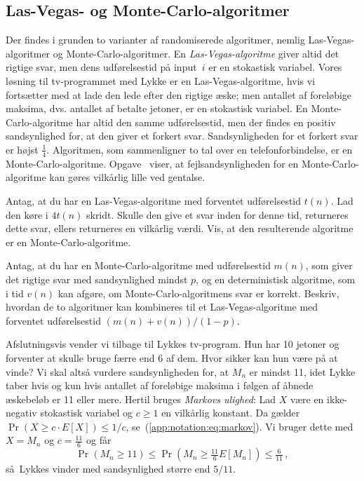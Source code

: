 \subsection{Las-Vegas- og Monte-Carlo-algoritmer}

Der findes i grunden to varianter af randomiserede algoritmer, 
nemlig Las-Vegas-algoritmer%
og Monte-Carlo-algoritmer.
En \emph{Las-Vegas-algoritme} giver altid det rigtige svar, men dens udførelsestid på input~$i$ er en stokastisk variabel. 
Vores løsning til tv-programmet med Lykke er en Las-Vegas-algoritme, hvis vi fortsætter med at lade den lede efter den rigtige æske;
men antallet af foreløbige maksima, dvs. antallet af betalte jetoner, er en stokastisk variabel.
En Monte-Carlo-algoritme har altid den samme udførelsestid, men der findes en positiv sandsynlighed for, at den giver et forkert svar.
Sandsynligheden for et forkert svar er højst $\frac14$.
Algoritmen, som sammenligner to tal over en telefonforbindelse, er en Monte-Carlo-algoritme. 
Opgave~ viser, at fejlsandsynligheden for en Monte-Carlo-algoritme kan gøres vilkårlig lille ved gentalse.  

\begin{exerc}
  Antag, at du har en Las-Vegas-algoritme med forventet udførelsestid $t(n)$. 
  Lad den køre i $4t(n)$ skridt.
  Skulle den give et svar inden for denne tid, returneres dette svar, ellers returneres en vilkårlig værdi.
  Vis, at den resulterende algoritme er en Monte-Carlo-algoritme.
\end{exerc}

\begin{exerc}
  Antag, at du har en Monte-Carlo-algoritme med udførelsestid $m(n)$, som giver det rigtige svar med sandsynlighed mindst $p$, og en deterministisk algoritme, som i tid $v(n)$ kan afgøre, om Monte-Carlo-algoritmens svar er korrekt.
  Beskriv, hvordan de to algoritmer kan kombineres til et Las-Vegas-algoritme med forventet udførelsestid $(m(n)+v(n))/(1-p)$.
\end{exerc}

Afslutningsvis vender vi tilbage til Lykkes tv-program.
Hun har 10 jetoner og forventer at skulle bruge færre end 6 af dem.
Hvor sikker kan hun være på at vinde?
Vi skal altså vurdere sandsynligheden for, at $M_n$ er mindst 11, idet Lykke taber hvis og kun hvis antallet af foreløbige maksima i følgen af åbnede æskebeløb er 11 eller mere.
Hertil bruges \emph{Markovs ulighed}:
Lad $X$ være en ikke-negativ stokastisk variabel og $c\ge 1$ en vilkårlig konstant.
Da gælder $\Pr(X \ge c \cdot E[X])\le 1/c$, se~(\ref{app:notation:eq:markov}).
Vi bruger dette med $X = M_n$ og $c = \frac{11}{6}$ og får
\[ \Pr(M_n \ge 11) \le \Pr(M_n \ge \tfrac{11}{6} E[M_n]) \le \tfrac{6}{11}
\,,\]
så Lykkes vinder med sandsynlighed større end $5/11$.




